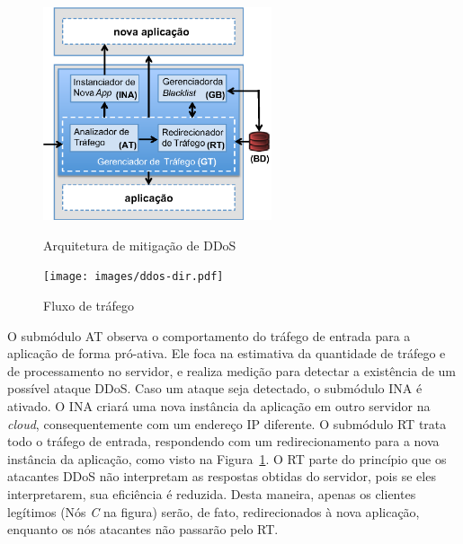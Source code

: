 \begin{figure}[t!]
  \centering
  \begin{minipage}[b]{0.59\linewidth}
    \centering
    \includegraphics[width=0.6\textwidth]{images/arq.eps}
	\caption{Arquitetura de mitigação de DDoS}
	\label{fig:arq}
  \end{minipage}
  \begin{minipage}[b]{0.4\linewidth}
    \centering
    \texttt{[image: images/ddos-dir.pdf]}
	\caption{Fluxo de tráfego}
	\label{fig:traf-ddos}
  \end{minipage}

\end{figure}



O submódulo AT observa o comportamento do tráfego de entrada para a aplicação de forma pró-ativa. Ele foca na estimativa da quantidade de tráfego e de processamento no servidor, e realiza medição para detectar a existência de um possível ataque DDoS. Caso um ataque seja detectado, o submódulo INA é ativado. O INA criará uma nova instância da aplicação em outro servidor na \emph{cloud}, consequentemente com um endereço IP diferente. %
O submódulo RT trata todo o tráfego de entrada, respondendo com um redirecionamento para a nova instância da aplicação, como visto na Figura~\ref{fig:traf-ddos}. O RT parte do princípio que os atacantes DDoS não interpretam as respostas obtidas do servidor, pois se eles interpretarem, sua eficiência é reduzida. Desta maneira, apenas os clientes legítimos (Nós \emph{C} na figura) serão, de fato, redirecionados à nova aplicação, enquanto os nós atacantes não passarão pelo RT.

